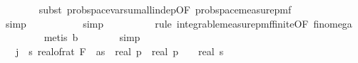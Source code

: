\begin{isabellebody}
\ \ \ \ \ \ \isamarkupfalse%
\ {\isacharparenleft}{\kern0pt}subst\ prob{\isacharunderscore}{\kern0pt}space{\isachardot}{\kern0pt}var{\isacharunderscore}{\kern0pt}sum{\isacharunderscore}{\kern0pt}all{\isacharunderscore}{\kern0pt}indep{\isacharbrackleft}{\kern0pt}OF\ prob{\isacharunderscore}{\kern0pt}space{\isacharunderscore}{\kern0pt}measure{\isacharunderscore}{\kern0pt}pmf{\isacharbrackright}{\kern0pt}{\isacharparenright}{\kern0pt}\isanewline
\ \ \ \ \ \ \ \ \ \ \isamarkupfalse%
\ {\isacharparenleft}{\kern0pt}simp{\isacharparenright}{\kern0pt}\isanewline
\ \ \ \ \ \ \ \ \ \isamarkupfalse%
\ {\isacharparenleft}{\kern0pt}simp{\isacharparenright}{\kern0pt}\isanewline
\ \ \ \ \ \ \ \ \isamarkupfalse%
\ {\isacharparenleft}{\kern0pt}rule\ integrable{\isacharunderscore}{\kern0pt}measure{\isacharunderscore}{\kern0pt}pmf{\isacharunderscore}{\kern0pt}finite{\isacharbrackleft}{\kern0pt}OF\ fin{\isacharunderscore}{\kern0pt}omega{\isacharunderscore}{\kern0pt}{}{\isacharbrackright}{\kern0pt}{\isacharparenright}{\kern0pt}\isanewline
\ \ \ \ \ \ \ \isamarkupfalse%
\ {\isacharparenleft}{\kern0pt}metis\ b{\isacharparenright}{\kern0pt}\isanewline
\ \ \ \ \ \ \isamarkupfalse%
\ simp\isanewline
\ \ \ \ \isamarkupfalse%
\ \isamarkupfalse%
\ {\isachardoublequoteopen}{\isachardot}{\kern0pt}{\isachardot}{\kern0pt}{\isachardot}{\kern0pt}\ {\isasymle}\ {\isacharparenleft}{\kern0pt}{\isasymSum}j\ {\isacharequal}{\kern0pt}\ {}{\isachardot}{\kern0pt}{\isachardot}{\kern0pt}{\isacharless}{\kern0pt}s\ {}{\isacharasterisk}{\kern0pt}{\isacharparenleft}{\kern0pt}real{\isacharunderscore}{\kern0pt}of{\isacharunderscore}{\kern0pt}rat\ {\isacharparenleft}{\kern0pt}F\ {}\ as{\isacharparenright}{\kern0pt}{\isacharcircum}{\kern0pt}{}{\isacharparenright}{\kern0pt}\ {\isacharasterisk}{\kern0pt}\ {\isacharparenleft}{\kern0pt}{\isacharparenleft}{\kern0pt}real\ p{\isacharparenright}{\kern0pt}\ {\isacharslash}{\kern0pt}\ {\isacharparenleft}{\kern0pt}{\isacharparenleft}{\kern0pt}{\isacharparenleft}{\kern0pt}real\ p{\isacharparenright}{\kern0pt}\ {\isacharminus}{\kern0pt}\ {}{\isacharparenright}{\kern0pt}\ {\isacharasterisk}{\kern0pt}\ real\ s\isanewline

\end{isabellebody}
